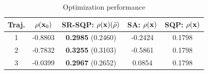 {\small
\begin{table}[htb]
\begin{center}
\caption{Optimization performance}
\label{tbl:opt_performance}
\begin{tabular} {|c|c|c|c|c|}
	\hline
	\textbf{Traj.} & $\rho(\mathbf{x}_0) $ & SR-SQP: $\rho(\mathbf{x}) (\tilde{\rho})$ & SA: $\rho(\mathbf{x})$ & SQP: $\rho(\mathbf{x})$\\ \hline
	1 & -0.8803 & \textbf{0.2985} (0.2460) & -0.2424 & 0.1798 \\ \hline
	2 & -0.7832 & \textbf{0.3255} (0.3103) & -0.5861 & 0.1798 \\ \hline
	3 & -0.0399 & \textbf{0.2967} (0.2652) & 0.0854 & 0.1798 \\ \hline
\end{tabular}	
\end{center}
\end{table}
}





